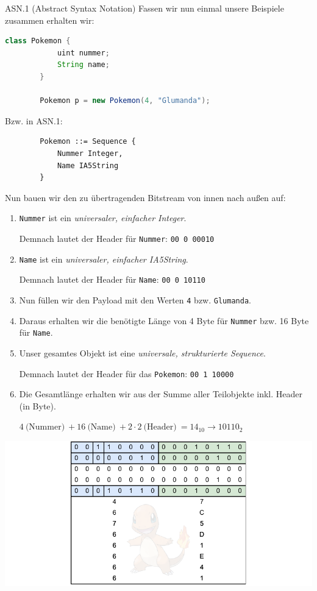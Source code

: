\begin{example}{ASN.1 (Abstract Syntax Notation)}
    Fassen wir nun einmal unsere Beispiele zusammen erhalten wir:

    \begin{lstlisting}[language=java]
        class Pokemon {
            uint nummer;
            String name;
        }

        Pokemon p = new Pokemon(4, "Glumanda");
    \end{lstlisting}

    Bzw. in ASN.1:

    \begin{lstlisting}
        Pokemon ::= Sequence {
            Nummer Integer,
            Name IA5String
        }
    \end{lstlisting}

    Nun bauen wir den zu übertragenden Bitstream von innen nach außen auf:

    \begin{enumerate}
        \item \texttt{Nummer} ist ein \emph{universaler, einfacher Integer}.

              Demnach lautet der Header für \texttt{Nummer}: \texttt{00 0 00010}
        \item \texttt{Name} ist ein \emph{universaler, einfacher IA5String}.

              Demnach lautet der Header für \texttt{Name}: \texttt{00 0 10110}
        \item Nun füllen wir den Payload mit den Werten \texttt{4} bzw. \texttt{Glumanda}.
        \item Daraus erhalten wir die benötigte Länge von 4 Byte für \texttt{Nummer} bzw. 16 Byte für \texttt{Name}.
        \item Unser gesamtes Objekt ist eine \emph{universale, strukturierte Sequence}.

              Demnach lautet der Header für das \texttt{Pokemon}: \texttt{00 1 10000}
        \item Die Gesamtlänge erhalten wir aus der Summe aller Teilobjekte inkl. Header (in Byte).

              $4 \ \text{(Nummer)} \ + 16 \ \text{(Name)} \ + 2 \cdot 2 \ \text{(Header)} \ = 14_{10} \to 10110_2$
    \end{enumerate}

    \includegraphics[width=\textwidth]{includes/figures/example_asn1.pdf}
\end{example}

